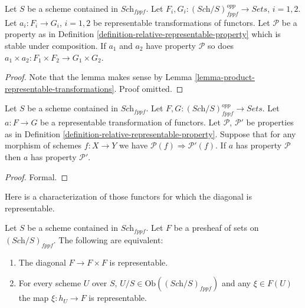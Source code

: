\begin{lemma}
\label{lemma-product-representable-transformations-property}
Let $S$ be a scheme contained in $\textit{Sch}_{fppf}$.
Let $F_i, G_i : (\textit{Sch}/S)_{fppf}^{opp} \to \textit{Sets}$,
$i = 1, 2$.
Let $a_i : F_i \to G_i$, $i = 1, 2$ be representable transformations
of functors.
Let $\mathcal{P}$ be a property as in
Definition \ref{definition-relative-representable-property}
which is stable under composition.
If $a_1$ and $a_2$ have property $\mathcal{P}$ so does
$a_1 \times a_2 : F_1 \times F_2 \longrightarrow G_1 \times G_2$.
\end{lemma}

\begin{proof}
Note that the lemma makes sense by
Lemma \ref{lemma-product-representable-transformations}.
Proof omitted.
\end{proof}

\begin{lemma}
\label{lemma-representable-transformations-property-implication}
Let $S$ be a scheme contained in $\textit{Sch}_{fppf}$.
Let $F, G : (\textit{Sch}/S)_{fppf}^{opp} \to \textit{Sets}$.
Let $a : F \to G$ be a representable transformation of functors.
Let $\mathcal{P}$, $\mathcal{P}'$ be properties as in
Definition \ref{definition-relative-representable-property}.
Suppose that for any morphism of schemes $f : X \to Y$
we have $\mathcal{P}(f) \Rightarrow \mathcal{P}'(f)$.
If $a$ has property $\mathcal{P}$ then
$a$ has property $\mathcal{P}'$.
\end{lemma}

\begin{proof}
Formal.
\end{proof}

\noindent
Here is a characterization of those functors for which the
diagonal is representable.

\begin{lemma}
\label{lemma-representable-diagonal}
Let $S$ be a scheme contained in $\textit{Sch}_{fppf}$.
Let $F$ be a presheaf of sets on $(\textit{Sch}/S)_{fppf}$.
The following are equivalent:
\begin{enumerate}
\item The diagonal $F \to F \times F$ is representable.
\item For every scheme $U$ over $S$,
$U/S \in \text{Ob}((\textit{Sch}/S)_{fppf})$
and any $\xi \in F(U)$ the map $\xi : h_U \to F$ is representable.
\end{enumerate}
\end{lemma}

